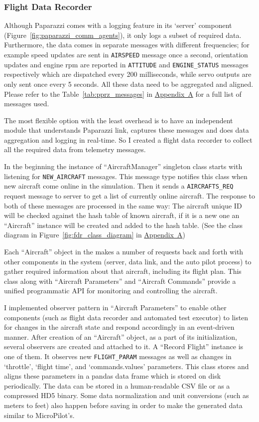 \subsubsection{Flight Data Recorder}
Although Paparazzi comes with a logging feature in its `server' component (Figure~\ref{fig:paparazzi_comm_agents}), it only logs a subset of required data. Furthermore, the data comes in separate messages with different frequencies; for example speed updates are sent in \verb|AIRSPEED| message once a second, orientation updates and engine rpm are reported in \verb|ATTITUDE| and \verb|ENGINE_STATUS| messages respectively which are dispatched every 200 milliseconds, while servo outputs are only sent once every 5 seconds. All these data need to be aggregated and aligned. Please refer to the Table~\ref{tab:pprz_messages} in \hyperref[appendixa]{Appendix~A} for a full list of messages used.

The most flexible option with the least overhead is to have an independent module that understands Paparazzi link, captures these messages and does data aggregation and logging in real-time. So I created a flight data recorder to collect all the required data from telemetry messages.

In the beginning the instance of ``AircraftManager'' singleton class starts with listening for \verb|NEW_AIRCRAFT| messages. This message type notifies this class when new aircraft come online in the simulation. Then it sends a \verb|AIRCRAFTS_REQ| request message to server to get a list of currently online aircraft. The response to both of these messages are processed in the same way: The aircraft unique ID will be checked against the hash table of known aircraft, if it is a new one an ``Aircraft'' instance will be created and added to the hash table. (See the class diagram in Figure~\ref{fig:fdr_class_diagram} in \hyperref[appendixa]{Appendix~A})

Each ``Aircraft'' object in the makes a number of requests back and forth with other components in the system (server, data link, and the auto pilot process) to gather required information about that aircraft, including its flight plan. This class along with ``Aircraft Parameters'' and ``Aircraft Commands'' provide a unified programmatic API for monitoring and controlling the aircraft. 

I implemented observer pattern \cite{gamma1995design} in ``Aircraft Parameters'' to enable other components (such as flight data recorder and automated test executor) to listen for changes in the aircraft state and respond accordingly in an event-driven manner. 
After creation of an ``Aircraft'' object, as a part of its initialization, several observers are created and attached to it. A ``Record Flight'' instance is one of them. It observes new \verb|FLIGHT_PARAM| messages as well as changes in `throttle', `flight time', and `commands.values' parameters. This class stores and aligns these parameters in a pandas data frame which is stored on disk periodically. The data can be stored in a human-readable CSV file or as a compressed HD5 binary. Some data normalization and unit conversions (such as meters to feet) also happen before saving in order to make the generated data similar to MicroPilot's.

